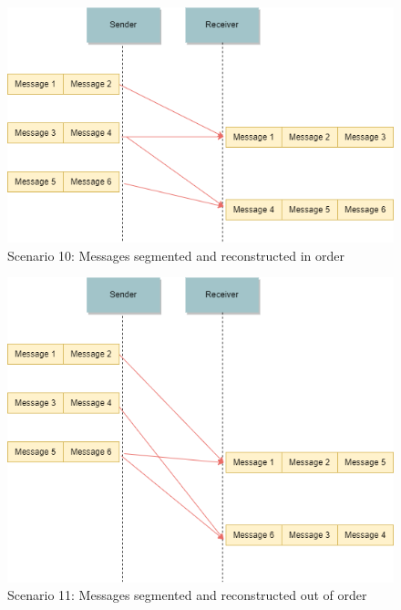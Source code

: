 \begin{figure}[ht!]
\centerline{\includegraphics[scale=0.6]{Figures/scenario10}}
 \caption{Scenario 10: Messages segmented and reconstructed in order}
\label{scenario10}
\end{figure}

\begin{figure}[ht!]
\centerline{\includegraphics[scale=0.6]{Figures/scenario11}}
 \caption{Scenario 11: Messages segmented and reconstructed out of order}
\label{scenario11}
\end{figure}

